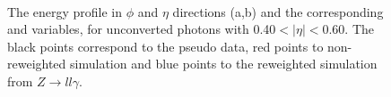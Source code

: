 \begin{figure}[htbp]
    \centering
	 \\
    \caption{The energy profile in $\phi$ and $\eta$ directions (a,b) and the corresponding \Rphi and \Reta variables, for unconverted photons with 0.40$<|\eta|<$0.60. The black points correspond to the pseudo data, red points to non-reweighted simulation and blue points to the reweighted simulation from $Z\rightarrow ll\gamma$.}
    \label{fig:gamma:ss:reweighting:photon:closure}
\end{figure}
